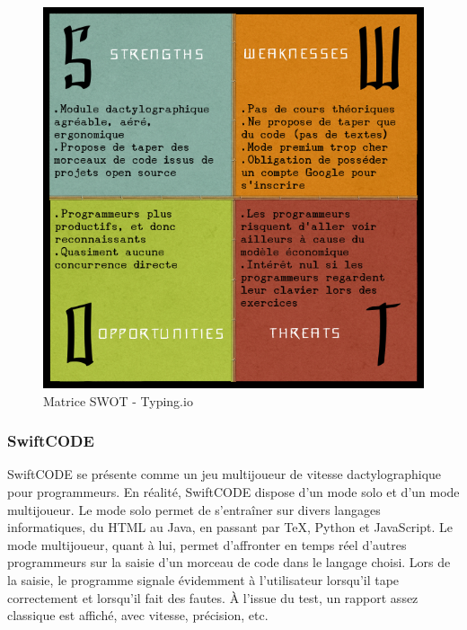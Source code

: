 \documentclass[a4paper,12pt]{article}
\begin{document}
\begin{figure}
\begin{center}
\includegraphics[scale=0.5]{swot-typingio.png}
\end{center}
\caption{Matrice SWOT - Typing.io}
\end{figure}

\subsubsection{SwiftCODE}

SwiftCODE se présente comme un jeu multijoueur de vitesse dactylographique pour programmeurs. En réalité, SwiftCODE dispose d'un mode solo et d'un mode multijoueur. Le mode solo permet de s'entraîner sur divers langages informatiques, du HTML au Java, en passant par TeX, Python et JavaScript. Le mode multijoueur, quant à lui, permet d'affronter en temps réel d'autres programmeurs sur la saisie d'un morceau de code dans le langage choisi. Lors de la saisie, le programme signale évidemment à l'utilisateur lorsqu'il tape correctement et lorsqu'il fait des fautes. À l'issue du test, un rapport assez classique est affiché, avec vitesse, précision, etc.
\end{document}
